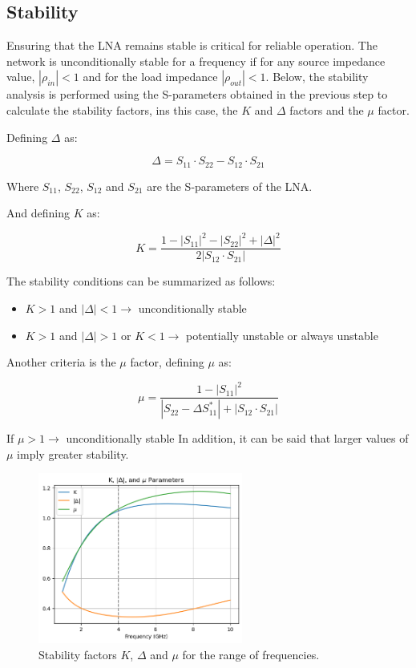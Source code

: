 \subsection{Stability}


Ensuring that the LNA remains stable is critical for reliable operation. The network is unconditionally stable for a frequency if for any source impedance value, $|\rho_{in}|<1$  and for the load impedance $|\rho_{out}|<1$.
Below, the stability analysis is performed using the S-parameters obtained in the previous step to calculate the stability factors, ins this case, the $K$ and $\Delta$ factors and the $\mu$ factor.

Defining $\Delta$ as:

\begin{equation}
    \Delta = S_{11}\cdot S_{22} - S_{12}\cdot S_{21}
    \label{eq:Delta}
\end{equation}

Where $S_{11}$, $S_{22}$, $S_{12}$ and $S_{21}$ are the S-parameters of the LNA. 

And defining $K$ as:

\begin{equation}
    K = \frac{1-|S_{11}|^2-|S_{22}|^2+|\Delta|^2}{2|S_{12}\cdot S_{21}|}
\end{equation}

The stability conditions can be summarized as follows:

\begin{itemize}
    \item $K>1$ and $|\Delta|<1\rightarrow$ unconditionally stable
    \item $K>1$ and $|\Delta| > 1$ or  $K<1 \rightarrow$ potentially unstable or always unstable
\end{itemize}

Another criteria is the $\mu$ factor, defining $\mu$ as:

$$\mu = \frac{1-|S_{11}|^2}{|S_{22}-\Delta S_{11}^*| + |S_{12}\cdot S_{21}|}$$

If $\mu > 1\rightarrow$ unconditionally stable
In addition, it can be said that larger values of $\mu$ imply greater stability.

\begin{figure}[H]
    \centering
    \includegraphics[width=0.6\textwidth]{Images/KFactor.png}
    \caption{Stability factors $K$, $\Delta$ and $\mu$ for the range of frequencies.}
    \label{fig:StabilityTest}
\end{figure}

